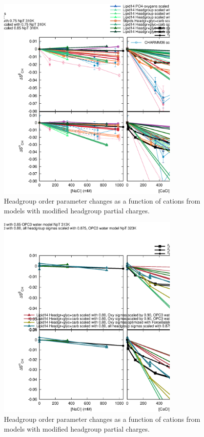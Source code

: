\documentclass[aip,jcp]{revtex4}
\begin{document}
\begin{figure}[]
  \centering
  \includegraphics[width=9.0cm]{../Fig/OrderParameterIONSchangesSCALED.eps}
  \caption{\label{OrderParameterIONSchangesSCALED}
    Headgroup order parameter changes as a function of cations from models
    with modified headgroup partial charges.}
\end{figure}

\begin{figure}[]
  \centering
  \includegraphics[width=9.0cm]{../Fig/OrderParameterCHANGESnewMODELS.eps}
  \caption{\label{OrderParameterCHANGESnewMODELS}
    Headgroup order parameter changes as a function of cations from models
    with modified headgroup partial charges.}
\end{figure}
\end{document}
